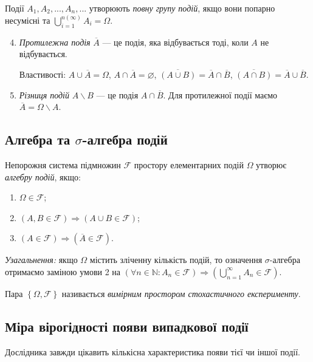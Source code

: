 \begin{definition}
    Події $A_1, A_2, ..., A_n, ...$ утворюють \emph{повну групу подій}, якщо вони попарно несумісні 
    та $\bigcup_{i=1}^{n \left( \infty \right)} A_i = \Omega$.
\end{definition}
\begin{enumerate}
    \setcounter{enumi}{3}
    \item \emph{Протилежна подія} $\overline{A}$ --- це подія, яка відбувається тоді, коли $A$ не відбувається.
    
    Властивості: $A \cup \overline{A} = \Omega$, $A \cap \overline{A} = \varnothing$, $\overline{\left( A \cup B \right)} = \overline{A} \cap \overline{B}$,
    $\overline{\left( A \cap B \right)} = \overline{A} \cup \overline{B}$.
    \item \emph{Різниця подій} $A \backslash B$ --- це подія $A \cap \overline{B}$. Для протилежної події маємо $\overline{A} =  \Omega \backslash A$.
\end{enumerate}

\subsection{Алгебра та $\sigma$-алгебра подій}
\begin{definition}
    Непорожня система підмножин $\mathcal{F}$ простору елементарних подій $\Omega$ утворює \emph{алгебру подій}, якщо:
    \begin{enumerate}
        \item $\Omega \in \mathcal{F}$;
        \item $\left( A, B \in \mathcal{F}\right) \Rightarrow \left( A \cup B \in \mathcal{F}\right)$;
        \item $\left( A \in \mathcal{F}\right) \Rightarrow \left( \overline{A} \in \mathcal{F}\right)$.
    \end{enumerate}
    \emph{Узагальнення:} якщо $\Omega$ містить зліченну кількість подій, то означення $\sigma$-алгебра отримаємо заміною умови
    2 на $\left(\forall n \in \mathbb{N}: A_n \in \mathcal{F} \right) \Rightarrow \left( \bigcup_{n=1}^{\infty} A_n \in \mathcal{F}\right)$.
    
    Пара $\left\{\Omega, \mathcal{F}\right\}$ називається \emph{вимірним простором стохастичного експерименту}.
\end{definition}

\subsection{Міра вірогідності появи випадкової події}
Дослідника завжди цікавить кількісна характеристика появи тієї чи іншої події.

